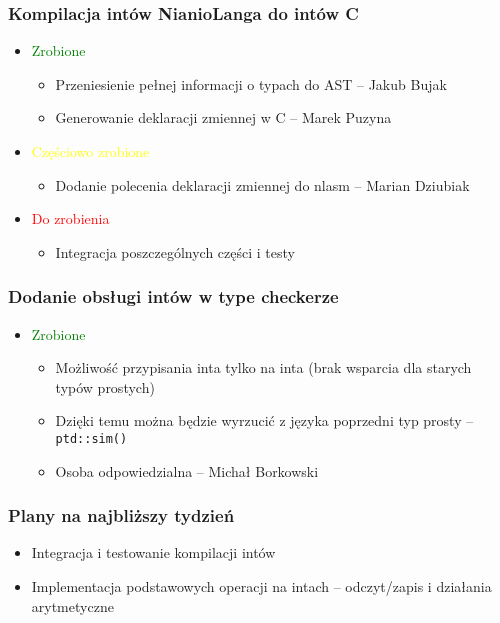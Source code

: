 \documentclass{beamer}
\begin{document}
	\begin{frame}
		\frametitle{Kompilacja intów NianioLanga do intów C}
		\begin{itemize}
			\item\textcolor{green}{Zrobione}
			\begin{itemize}
				\item Przeniesienie pełnej informacji o typach do AST -- Jakub Bujak
				\item Generowanie deklaracji zmiennej w C -- Marek Puzyna
			\end{itemize}
			\item\textcolor{yellow}{Częściowo zrobione}
			\begin{itemize}
				\item Dodanie polecenia deklaracji zmiennej do nlasm -- Marian Dziubiak
			\end{itemize}
			\item\textcolor{red}{Do zrobienia}
			\begin{itemize}
				\item Integracja poszczególnych części i testy
			\end{itemize}
		\end{itemize}
	\end{frame}
	
	\begin{frame}
		\frametitle{Dodanie obsługi intów w type checkerze}
		\begin{itemize}
			\item\textcolor{green}{Zrobione}
			\begin{itemize}
				\item Możliwość przypisania inta tylko na inta (brak wsparcia dla starych typów prostych)
				\item Dzięki temu można będzie wyrzucić z języka poprzedni typ prosty -- \texttt{ptd::sim()}
				\item Osoba odpowiedzialna -- Michał Borkowski
			\end{itemize}
		\end{itemize}
	\end{frame}
	
	\begin{frame}
		\frametitle{Plany na najbliższy tydzień}
		\begin{itemize}
			\item Integracja i testowanie kompilacji intów
			\item Implementacja podstawowych operacji na intach -- odczyt/zapis i działania arytmetyczne
		\end{itemize}
	\end{frame}
\end{document}
